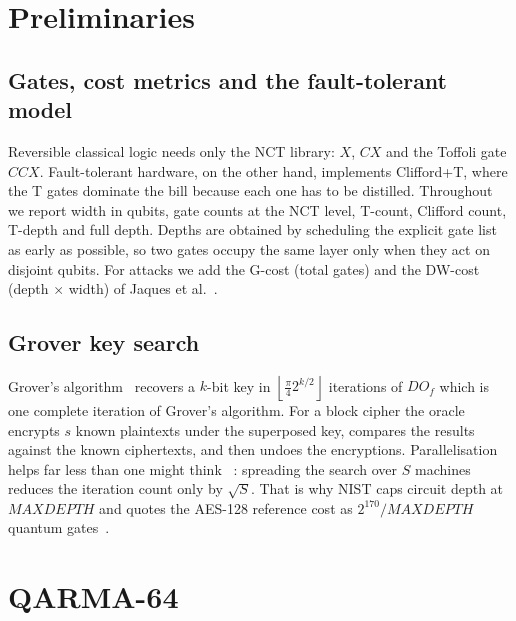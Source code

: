 \documentclass[runningheads,10pt]{llncs}
\begin{document}
\section{Preliminaries}

\subsection{Gates, cost metrics and the fault-tolerant model}

Reversible classical logic needs only the NCT library: $X$, $CX$ and the Toffoli gate $CCX$. Fault-tolerant hardware, on the other hand, implements Clifford+T, where the T gates dominate the bill because each one has to be distilled. Throughout we report width in qubits, gate counts at the NCT level, T-count, Clifford count, T-depth and full depth. Depths are obtained by scheduling the explicit gate list as early as possible, so two gates occupy the same layer only when they act on disjoint qubits. For attacks we add the G-cost (total gates) and the DW-cost (depth $\times$ width) of Jaques et al.~\cite{jaques2020implementing}.

\subsection{Grover key search}

Grover's algorithm~\cite{grover1996fast,boyer1998tight} recovers a $k$-bit key in $\left\lfloor \frac{\pi}{4} 2^{k/2} \right\rfloor$ iterations of $D O_f$ which is one complete iteration of Grover's algorithm. For a block cipher the oracle encrypts $s$ known plaintexts under the superposed key, compares the results against the known ciphertexts, and then undoes the encryptions. Parallelisation helps far less than one might think ~\cite{zalka1999grovers}: spreading the search over $S$ machines reduces the iteration count only by $\sqrt{S}$. That is why NIST caps circuit depth at $MAXDEPTH$ and quotes the AES-128 reference cost as $2^{170}/MAXDEPTH$  quantum gates~\cite{nist2016submission}.

\section{QARMA-64}
\end{document}
